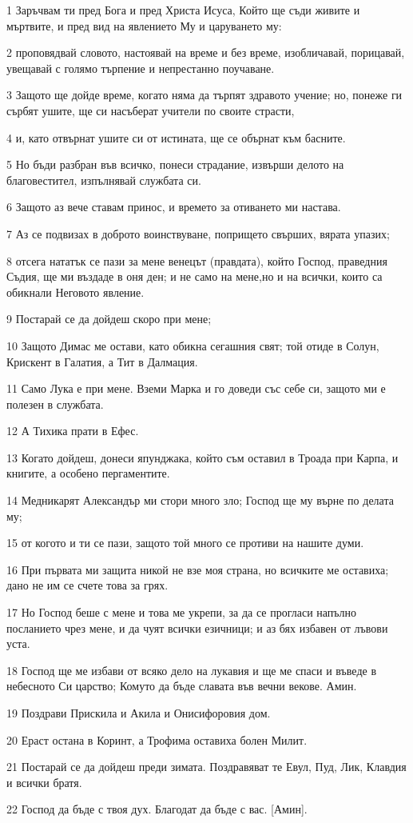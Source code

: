 \par 1 Заръчвам ти пред Бога и пред Христа Исуса, Който ще съди живите и мъртвите, и пред вид на явлението Му и царуването му:
\par 2 проповядвай словото, настоявай на време и без време, изобличавай, порицавай, увещавай с голямо търпение и непрестанно поучаване.
\par 3 Защото ще дойде време, когато няма да търпят здравото учение; но, понеже ги сърбят ушите, ще си насъберат учители по своите страсти,
\par 4 и, като отвърнат ушите си от истината, ще се обърнат към басните.
\par 5 Но бъди разбран във всичко, понеси страдание, извърши делото на благовестител, изпълнявай службата си.
\par 6 Защото аз вече ставам принос, и времето за отиването ми настава.
\par 7 Аз се подвизах в доброто воинствуване, попрището свърших, вярата упазих;
\par 8 отсега нататък се пази за мене венецът (правдата), който Господ, праведния Съдия, ще ми въздаде в оня ден; и не само на мене,но и на всички, които са обикнали Неговото явление.
\par 9 Постарай се да дойдеш скоро при мене;
\par 10 Защото Димас ме остави, като обикна сегашния свят; той отиде в Солун, Крискент в Галатия, а Тит в Далмация.
\par 11 Само Лука е при мене. Вземи Марка и го доведи със себе си, защото ми е полезен в службата.
\par 12 А Тихика прати в Ефес.
\par 13 Когато дойдеш, донеси япунджака, който съм оставил в Троада при Карпа, и книгите, а особено пергаментите.
\par 14 Медникарят Александър ми стори много зло; Господ ще му върне по делата му;
\par 15 от когото и ти се пази, защото той много се противи на нашите думи.
\par 16 При първата ми защита никой не взе моя страна, но всичките ме оставиха; дано не им се счете това за грях.
\par 17 Но Господ беше с мене и това ме укрепи, за да се прогласи напълно посланието чрез мене, и да чуят всички езичници; и аз бях избавен от лъвови уста.
\par 18 Господ ще ме избави от всяко дело на лукавия и ще ме спаси и въведе в небесното Си царство; Комуто да бъде славата във вечни векове. Амин.
\par 19 Поздрави Прискила и Акила и Онисифоровия дом.
\par 20 Ераст остана в Коринт, а Трофима оставиха болен Милит.
\par 21 Постарай се да дойдеш преди зимата. Поздравяват те Евул, Пуд, Лик, Клавдия и всички братя.
\par 22 Господ да бъде с твоя дух. Благодат да бъде с вас. [Амин].

